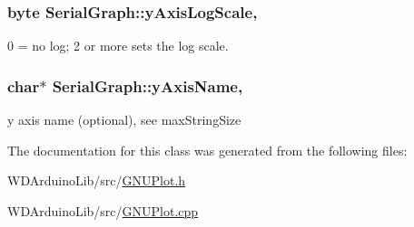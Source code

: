 \subsubsection[{y\+Axis\+Log\+Scale}]{\setlength{\rightskip}{0pt plus 5cm}byte Serial\+Graph\+::y\+Axis\+Log\+Scale\hspace{0.3cm}{\ttfamily [protected]}, {\ttfamily [inherited]}}\label{class_serial_graph_a1f0424857ec14c176747b3ddb0768eee}
0 = no log; 2 or more sets the log scale. \hypertarget{class_serial_graph_a08452a56c74ec5f5473b64605d555339}{}
\subsubsection[{y\+Axis\+Name}]{\setlength{\rightskip}{0pt plus 5cm}char$\ast$ Serial\+Graph\+::y\+Axis\+Name\hspace{0.3cm}{\ttfamily [protected]}, {\ttfamily [inherited]}}\label{class_serial_graph_a08452a56c74ec5f5473b64605d555339}
y axis name (optional), see max\+String\+Size 

The documentation for this class was generated from the following files\+:\begin{DoxyCompactItemize}
\item 
W\+D\+Arduino\+Lib/src/\hyperlink{_g_n_u_plot_8h}{G\+N\+U\+Plot.\+h}\item 
W\+D\+Arduino\+Lib/src/\hyperlink{_g_n_u_plot_8cpp}{G\+N\+U\+Plot.\+cpp}\end{DoxyCompactItemize}
